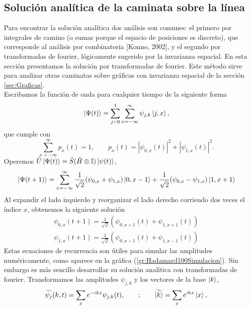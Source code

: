 \begin{appendix}
\chapter{Solución analítica de la caminata sobre la línea}\label{Anexo:SolucionLinea}
Para encontrar la solución analítica dos análisis son comunes: el primero por integrales de camino (o sumas porque el espacio de posiciones es discreto), que corresponde al análisis por combinatoria [Konno, 2002], y el segundo por transformadas de fourier, lógicamente sugerido por la invarianza espacial. En esta sección presentamos la solución por transformadas de fourier. Este método sirve para analizar otras caminatas sobre gráficas con invarianza espacial de la sección \ref{sec:Graficas}.\\
Escribamos la función de onda para cualquier tiempo de la siguiente forma
\begin{equation}{}
\ket{\Psi(t)}=\sum_{j=0}^1\sum_{x=-\infty}^\infty\psi_{j,k}\ket{j,x},
\end{equation}
que cumple con
\begin{equation}
    \sum_{x=-\infty}^\infty p_x(t)=1,\qquad p_x(t)=|\psi_{0,x}(t)|^2+|\psi_{1,x}(t)|^2.
\end{equation}{}
Operemos $\hat{U}\ket{\Psi(t)}=\hat{S}(\hat{H}\otimes\mathbb{I})\ket{\psi(t)}$,
\begin{equation}{}
    \ket{\Psi(t+1)}=\sum_{x=-\infty}^\infty \frac{1}{\sqrt{2}}(\psi_{0,x}+\psi_{1,x})\ket{0,x-1}+\frac{1}{\sqrt{2}}(\psi_{0,x}-\psi_{1,x})\ket{1,x+1}
\end{equation}{}
Al expandir el lado izquierdo y reorganizar el lado derecho corriendo dos veces el índice $x$, obtenemos la siguiente solución
\begin{align}
    \psi_{0,x}(t+1)=\frac{1}{\sqrt{2}}(\psi_{0,x+1}(t)+\psi_{1,x+1}(t))\\
    \psi_{1,x}(t+1)=\frac{1}{\sqrt{2}}(\psi_{0,x-1}(t)+\psi_{1,x-1}(t))
\end{align}{}
Estas ecuaciones de recurrencia son útiles para simular las amplitudes numéricamente, como aparece en la gráfica (\ref{gr:Hadamard100Simulacion}). Sin embargo es más sencillo desarrollar su solución analítica con transformadas de fourier.
Transformamos las amplitudes $\psi_{j,k}$ y los vectores de la base $\ket{k}$,
\begin{equation}
    \widetilde{\psi_j}(k,t)=\sum_{x}e^{-ikx}\psi_{j,k}(t),\qquad ;\qquad
    \widetilde{\ket{k}}=\sum_xe^{ikx}\ket{x},
    \label{T.F.}
\end{equation}{}


\end{appendix}
